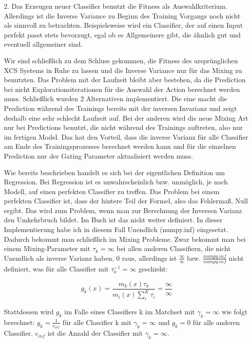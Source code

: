 \documentclass[10pt]{ocsmnar}
\begin{document}
2. Das Erzeugen neuer Classifier benutzt die Fitness als Auswahlkriterium. Allerdings ist die Inverse Variance zu Beginn des Training Vorgangs noch nicht als sinnvoll zu betrachten. Beispielsweise wird ein Classifier, der auf einen Input perfekt passt stets bevorzugt, egal ob es Allgemeinere gibt, die ähnlich gut und eventuell allgemeiner sind.  

Wir sind schließlich zu dem Schluss gekommen, die Fitness des ursprünglichen XCS Systems in Ruhe zu lassen und die Inverse Variance nur für das Mixing zu benutzten. Das Problem mit der Laufzeit bleibt aber bestehen, da die Prediction bei nicht Explorationsiterationen für die Auswahl der Action berechnet werden muss. Schließlich wurden 2 Alternativen implementiert. Die eine macht die Prediction während des Trainings bereits mit der inversen Invarianz und zeigt deshalb eine sehr schlecht Laufzeit auf. Bei der anderen wird die neue Mixing Art nur bei Predictions benutzt, die nicht während des Trainings auftreten, also nur im fertigen Model. Das hat den Vorteil, dass die inverse Varianz für alle Classifier am Ende des Trainingsprozesses berechnet werden kann und für die einzelnen Prediction nur der Gating Parameter aktualisiert werden muss.  
 


Wie bereits beschrieben handelt es sich bei der eigentlichen Definition um Regression. Bei Regression ist es unwahrscheinlich bzw. unmöglich, je nach Modell, auf einen perfekten Classifier zu treffen. Das Problem bei einem perfekten Classifier ist, dass der hintere Teil der Formel, also das Fehlermaß, Null ergibt. Das wird zum Problem, wenn man zur Berechnung der Inversen Varianz den Umkehrbruch bildet. Im Buch ist das nicht weiter definiert. In dieser Implementierung habe ich in diesem Fall Unendlich (numpy.inf) eingesetzt. Dadurch bekommt man schließlich im Mixing Probleme. Zwar bekommt man bei einem Mixing-Parameter mit  $\tau_{k} =   \infty$ bei allen anderen Classifiern, die nicht Unendlich als inverse Varianz haben, 0 raus, allerdings ist $\frac{\infty}{\infty}$ bzw. $\frac{numpy.inf}{numpy.inf}$ nicht definiert, was für alle Classifier mit $\tau_{k}^{-1} = \infty$ geschieht:

$$ g_k(x) = \frac{m_k(x)\tau_k}{m_i(x)\sum_i^K \tau_i} = \frac{\infty}{\infty} $$

Stattdessen wird $g_{k}$ im Falle eines Classifiers k im Matchset mit $\gamma_{k} = \infty$ wie folgt berechnet: $g_{k} = \frac{1}{c_{inf}} $ für alle Classifier k mit $\gamma_{k} = \infty$ und $g_{k} = 0$ für alle anderen Classifier. $c_{inf}$ ist die Anzahl der Classifier mit $\gamma_{k} = \infty$.
\end{document}
